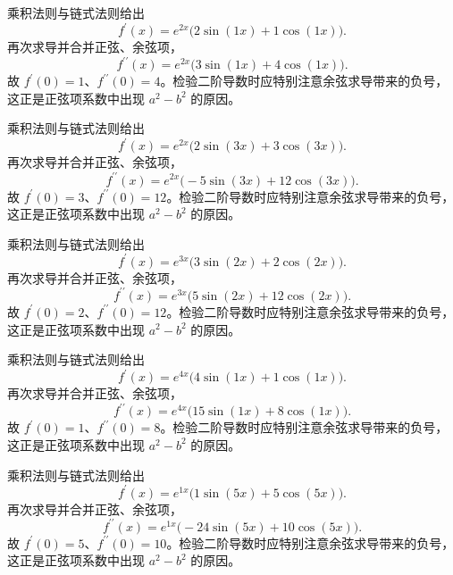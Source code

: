 \documentclass[UTF8,12pt,a4paper,fontset=fandol]{ctexart}
\begin{document}
\begin{solve}\label{ans:c8q20}
乘积法则与链式法则给出
\[
f^{\prime}(x)=e^{2x}\bigl(2\sin(1x)+1\cos(1x)\bigr).
\]
再次求导并合并正弦、余弦项，
\[
f^{\prime\prime}(x)=e^{2x}\bigl(3\sin(1x)+4\cos(1x)\bigr).
\]
故 $f^{\prime}(0)=1$、$f^{\prime\prime}(0)=4$。检验二阶导数时应特别注意余弦求导带来的负号，这正是正弦项系数中出现 $a^2-b^2$ 的原因。
\end{solve}

\begin{solve}\label{ans:c8q21}
乘积法则与链式法则给出
\[
f^{\prime}(x)=e^{2x}\bigl(2\sin(3x)+3\cos(3x)\bigr).
\]
再次求导并合并正弦、余弦项，
\[
f^{\prime\prime}(x)=e^{2x}\bigl(-5\sin(3x)+12\cos(3x)\bigr).
\]
故 $f^{\prime}(0)=3$、$f^{\prime\prime}(0)=12$。检验二阶导数时应特别注意余弦求导带来的负号，这正是正弦项系数中出现 $a^2-b^2$ 的原因。
\end{solve}

\begin{solve}\label{ans:c8q22}
乘积法则与链式法则给出
\[
f^{\prime}(x)=e^{3x}\bigl(3\sin(2x)+2\cos(2x)\bigr).
\]
再次求导并合并正弦、余弦项，
\[
f^{\prime\prime}(x)=e^{3x}\bigl(5\sin(2x)+12\cos(2x)\bigr).
\]
故 $f^{\prime}(0)=2$、$f^{\prime\prime}(0)=12$。检验二阶导数时应特别注意余弦求导带来的负号，这正是正弦项系数中出现 $a^2-b^2$ 的原因。
\end{solve}

\begin{solve}\label{ans:c8q23}
乘积法则与链式法则给出
\[
f^{\prime}(x)=e^{4x}\bigl(4\sin(1x)+1\cos(1x)\bigr).
\]
再次求导并合并正弦、余弦项，
\[
f^{\prime\prime}(x)=e^{4x}\bigl(15\sin(1x)+8\cos(1x)\bigr).
\]
故 $f^{\prime}(0)=1$、$f^{\prime\prime}(0)=8$。检验二阶导数时应特别注意余弦求导带来的负号，这正是正弦项系数中出现 $a^2-b^2$ 的原因。
\end{solve}

\begin{solve}\label{ans:c8q24}
乘积法则与链式法则给出
\[
f^{\prime}(x)=e^{1x}\bigl(1\sin(5x)+5\cos(5x)\bigr).
\]
再次求导并合并正弦、余弦项，
\[
f^{\prime\prime}(x)=e^{1x}\bigl(-24\sin(5x)+10\cos(5x)\bigr).
\]
故 $f^{\prime}(0)=5$、$f^{\prime\prime}(0)=10$。检验二阶导数时应特别注意余弦求导带来的负号，这正是正弦项系数中出现 $a^2-b^2$ 的原因。
\end{solve}
\end{document}
